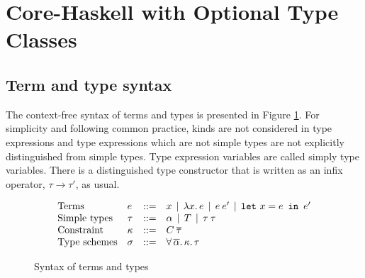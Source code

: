 \section{Core-Haskell with Optional Type Classes}
\label{Optional-type-classes}

\subsection{Term and type syntax}
\label{syntax}

The context-free syntax of terms and types is presented in Figure
\ref{term-types-syntax}. For simplicity and following common practice,
kinds are not considered in type expressions and type expressions
which are not simple types are not explicitly distinguished from
simple types. Type expression variables are called simply type
variables. There is a distinguished type constructor that is written
as an infix operator, $\tau \to \tau'$, as usual.

\begin{figure}[ht]
	\[
	\begin{array}{llcl}
	\text{Terms}              & e     & ::= & x                     \,\mid\,
	\lambda x.\,e         \,\mid\,
	e\:e'                  \,\mid\,
	{\tt let}\  x = e\,\ {\tt in}\ \,e'  \\
	\text{Simple types}      & \tau   & ::= & \alpha \,\mid\,
	T  \,\mid\, \tau\:\tau    \\
        \text{Constraint} &  \kappa & ::= & C\:\overline{\tau} \\
	\text{Type schemes}      & \sigma & ::= & \forall\,\overline{\alpha}.\,\kappa.\,\tau 
	\end{array}
	\]
	\caption{Syntax of terms and types}
	\label{term-types-syntax}
\end{figure}
